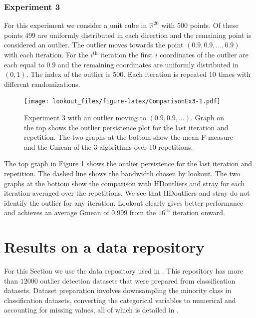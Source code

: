 \documentclass[11pt,a4paper,]{article}
\theoremstyle{definition}
\theoremstyle{definition}
\theoremstyle{definition}
\theoremstyle{remark}
\begin{document}
\hypertarget{experiment-3}{%
\subsubsection{\texorpdfstring{Experiment 3 \label{sec:exp3}}{Experiment 3 }}\label{experiment-3}}

For this experiment we consider a unit cube in \(\mathbb{R}^{20}\) with 500 points. Of these points 499 are uniformly distributed in each direction and the remaining point is considered an outlier. The outlier moves towards the point \(\left( 0.9, 0.9, \ldots, 0.9 \right)\) with each iteration. For the \(i^{\text{th}}\) iteration the first \(i\) coordinates of the outlier are each equal to \(0.9\) and the remaining coordinates are uniformly distributed in \((0,1)\). The index of the outlier is 500. Each iteration is repeated 10 times with different randomizations.

\begin{figure}
\centering
\texttt{[image: lookout\_files/figure-latex/ComparisonEx3-1.pdf]}
\caption{\label{fig:ComparisonEx3}Experiment 3 with an outlier moving to \((0.9, 0.9, . . .)\). Graph on the top shows the outlier persistence plot for the last iteration and repetition. The two graphs at the bottom show the mean F-measure and the Gmean of the 3 algorithms over 10 repetitions.}
\end{figure}

The top graph in Figure \ref{fig:ComparisonEx3} shows the outlier persistence for the last iteration and repetition. The dashed line shows the bandwidth chosen by lookout. The two graphs at the bottom show the comparison with HDoutliers and stray for each iteration averaged over the repetitions. We see that HDoutliers and stray do not identify the outlier for any iteration. Lookout clearly gives better performance and achieves an average Gmean of 0.999 from the \(16^{\text{th}}\) iteration onward.

\hypertarget{results-on-a-data-repository}{%
\section{\texorpdfstring{Results on a data repository \label{sec:applications}}{Results on a data repository }}\label{results-on-a-data-repository}}

For this Section we use the data repository used in \textcite{datasets}. This repository has more than \(12000\) outlier detection datasets that were prepared from classification datasets. Dataset preparation involves downsampling the minority class in classification datasets, converting the categorical variables to numerical and accounting for missing values, all of which is detailed in \textcite{normalizationoutliers}.
\end{document}
